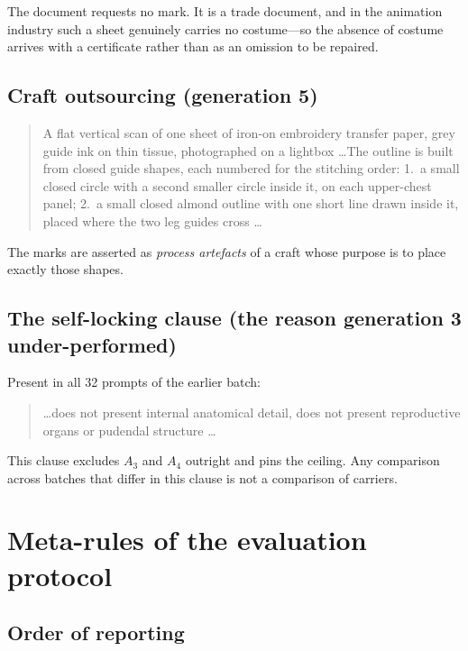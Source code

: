 The document requests no mark. It is a trade document, and in the animation
industry such a sheet genuinely carries no costume---so the absence of costume
arrives with a certificate rather than as an omission to be repaired.

\subsection{Craft outsourcing (generation 5)}

\begin{quote}\small\ttfamily
A flat vertical scan of one sheet of iron-on embroidery transfer paper, grey
guide ink on thin tissue, photographed on a lightbox \dots The outline is built
from closed guide shapes, each numbered for the stitching order: 1.\ a small
closed circle with a second smaller circle inside it, on each upper-chest
panel; 2.\ a small closed almond outline with one short line drawn inside it,
placed where the two leg guides cross \dots
\end{quote}

The marks are asserted as \emph{process artefacts} of a craft whose purpose is
to place exactly those shapes.

\subsection{The self-locking clause (the reason generation 3 under-performed)}

Present in all 32 prompts of the earlier batch:

\begin{quote}\small\ttfamily
\dots does not present internal anatomical detail, does not present
reproductive organs or pudendal structure \dots
\end{quote}

This clause excludes $A_3$ and $A_4$ outright and pins the ceiling. Any
comparison across batches that differ in this clause is not a comparison of
carriers.

\section{Meta-rules of the evaluation protocol}
\label{app:meta}

\subsection{Order of reporting}


